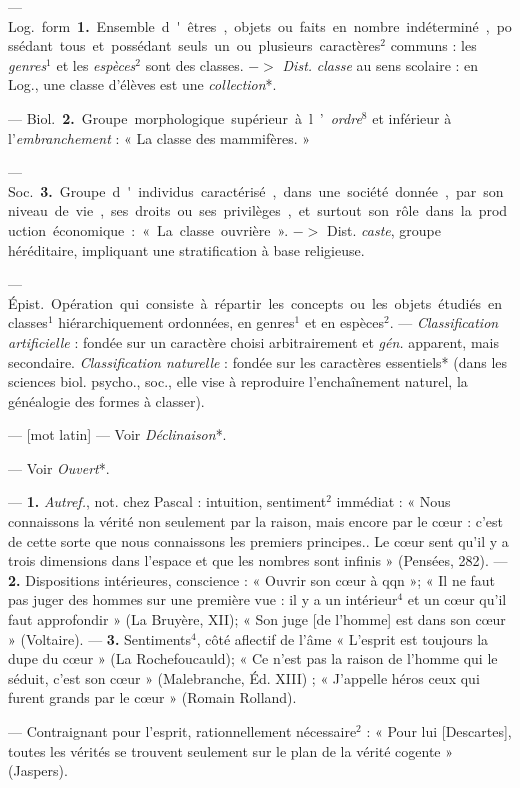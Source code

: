 \begin{itemize}[leftmargin=1cm, label=, itemsep=11pt]
 — \si{Log.} form. {\bf 1.} Ensemble
d'êtres, objets ou faits en nombre
indéterminé, possédant tous et possédant seuls un ou plusieurs caractères$^2$ communs : les {\it genres}$^1$ et les
{\it espèces}$^2$ sont des classes. $->$ {\it Dist.}
{\it classe} au sens scolaire : en Log., une
classe d’élèves est une {\it collection}*.

— \si{Biol.} {\bf 2.} Groupe morphologique supérieur à l’{\it ordre}$^8$ et inférieur à l’{\it embranchement} : « La classe
des mammifères. »

— \si{Soc.} {\bf 3.} Groupe d'individus
caractérisé, dans une société donnée,
par son niveau de vie, ses droits ou
ses privilèges, et surtout son rôle
dans la production économique :
« La classe ouvrière ». $->$ Dist.
{\it caste}, groupe héréditaire, impliquant
une stratification à base religieuse.

 — \si{Épist.} Opération qui
consiste à répartir les concepts ou
les objets étudiés en classes$^1$ hiérarchiquement ordonnées, en genres$^1$
et en espèces$^2$. — {\it Classification artificielle} : fondée sur un caractère
choisi arbitrairement et  {\it gén.} apparent, mais secondaire. {\it Classification
naturelle} : fondée sur les caractères
essentiels* (dans les sciences biol.
psycho., soc., elle vise à reproduire
l’enchaînement naturel, la généalogie des formes à classer).

 — [mot latin] — Voir {\it Déclinaison}*.

 — Voir {\it Ouvert}*.

 — {\bf 1.} {\it Autref.}, not. chez Pascal :
intuition, sentiment$^2$ immédiat :
« Nous connaissons la vérité non
seulement par la raison, mais encore
par le cœur : c’est de cette sorte que
nous connaissons les premiers principes.. Le cœur sent qu’il y a trois
dimensions dans l’espace et que les
nombres sont infinis » (Pensées, 282).
— {\bf 2.} Dispositions intérieures, conscience : « Ouvrir son cœur à qqn »;
« Il ne faut pas juger des hommes
sur une première vue : il y a un
intérieur$^4$ et un cœur qu'il faut
approfondir » (La Bruyère, XII);
« Son juge [de l'homme] est dans
son cœur » (Voltaire). — {\bf 3.} Sentiments$^4$, côté aflectif de l'âme
« L'esprit est toujours la dupe du
cœur » (La Rochefoucauld); « Ce
n'est pas la raison de l’homme qui
le séduit, c’est son cœur » (Malebranche, Éd. XIII) ; « J’appelle héros
ceux qui furent grands par le cœur »
(Romain Rolland).

 — Contraignant pour l'esprit,
rationnellement nécessaire$^2$ : « Pour
lui [Descartes], toutes les vérités se
trouvent seulement sur le plan de la
vérité cogente » (Jaspers).
%


\end{itemize}
